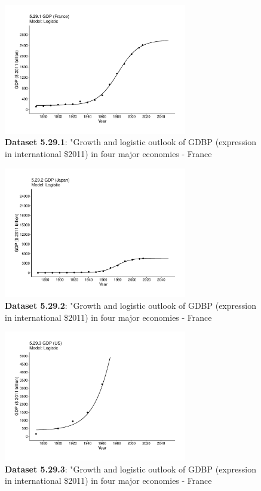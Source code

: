 \documentclass[aps,rmp,preprint,superscriptaddress,10pt,onecolumn]{article}
\begin{document}
\begin{figure}[h]

\includegraphics[width=8cm]{output/figs-ggplot/5.29.1.pdf}
\caption{\textbf{Dataset 5.29.1}: "Growth and logistic outlook of GDBP (expression in international \$2011) in four major economies - France}
\end{figure}
	
\begin{figure}[h]
\includegraphics[width=8cm]{output/figs-ggplot/5.29.2.pdf}
\caption{\textbf{Dataset 5.29.2}: "Growth and logistic outlook of GDBP (expression in international \$2011) in four major economies - France}
\end{figure}
	
\begin{figure}[h]
\includegraphics[width=8cm]{output/figs-ggplot/5.29.3.pdf}
\caption{\textbf{Dataset 5.29.3}: "Growth and logistic outlook of GDBP (expression in international \$2011) in four major economies - France}
\end{figure}
	
\end{document}
